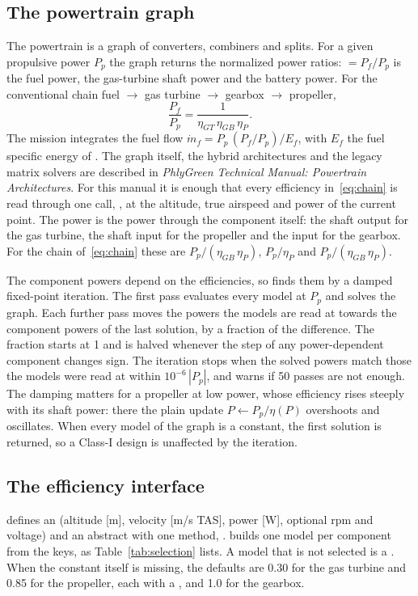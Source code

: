 \documentclass[a4paper,11pt]{article}
\newcommand{\etagt}{\eta_{GT}}
\begin{document}
\subsection{The powertrain graph}
The powertrain is a graph of converters, combiners and splits. For a given propulsive power
$P_p$ the graph returns the normalized power ratios:  $= P_f/P_p$ is the fuel
power,  the gas-turbine shaft power and  the battery power.
For the conventional chain fuel $\to$ gas turbine $\to$ gearbox $\to$ propeller,
\begin{equation}
  \frac{P_f}{P_p} = \frac{1}{\etagt\,\eta_{GB}\,\eta_{P}} .
  \label{eq:chain}
\end{equation}
The mission integrates the fuel flow $\dot m_f = P_p\,(P_f/P_p)/E_f$, with $E_f$ the fuel
specific energy of . The graph itself, the hybrid architectures and the
legacy matrix solvers are described in \emph{PhlyGreen Technical Manual: Powertrain
Architectures}. For this manual it is enough that every efficiency in~\eqref{eq:chain} is read
through one call, , at the altitude, true
airspeed and power of the current point. The power  is the power through the
component itself: the shaft output for the gas turbine, the shaft input for the propeller and
the input for the gearbox. For the chain of~\eqref{eq:chain} these are
$P_p/(\eta_{GB}\,\eta_P)$, $P_p/\eta_P$ and $P_p/(\eta_{GB}\,\eta_P)$.

The component powers depend on the efficiencies, so 
finds them by a damped fixed-point iteration. The first pass evaluates every model at $P_p$ and
solves the graph. Each further pass moves the powers the models are read at towards the
component powers of the last solution, by a fraction  of the difference. The
fraction starts at 1 and is halved whenever the step of any power-dependent component changes
sign. The iteration stops when the solved powers match those the models were read at within
$10^{-6}\,|P_p|$, and warns if 50 passes are not enough. The damping matters for a propeller at
low power, whose efficiency rises steeply with its shaft power: there the plain update
$P \leftarrow P_p/\eta(P)$ overshoots and oscillates. When every model of the graph is a
constant, the first solution is returned, so a Class-I design is unaffected by the iteration.

\subsection{The efficiency interface}
 defines an  (altitude [m], velocity [m/s TAS],
power [W], optional rpm and voltage) and an abstract  with one method,
.  builds one model per component from the
 keys, as Table~\ref{tab:selection} lists. A model that is not selected is a
. When the constant itself is missing, the defaults are 0.30 for the
gas turbine and 0.85 for the propeller, each with a , and 1.0 for the
gearbox.
\end{document}
